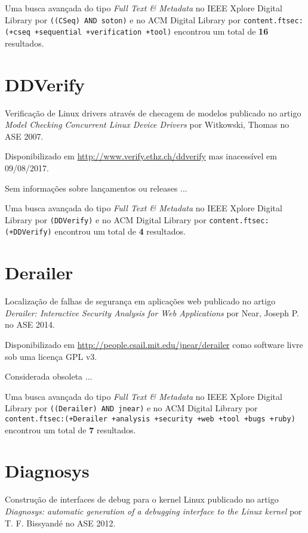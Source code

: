 Uma busca avançada do tipo {\it Full Text \& Metadata} no IEEE Xplore Digital Library por
\texttt{((CSeq) AND soton)}
e no ACM Digital Library por
\texttt{content.ftsec:(+cseq +sequential +verification +tool)}
encontrou um total de
{\bf 16}
resultados.

\section{DDVerify}

Verificação de Linux drivers através de checagem de modelos
publicado no artigo {\it Model Checking Concurrent Linux Device Drivers}
por Witkowski, Thomas
no ASE 2007.

Disponibilizado em \url{http://www.verify.ethz.ch/ddverify}
mas inacessível em 09/08/2017.

Sem informações sobre lançamentos ou releases ...


Uma busca avançada do tipo {\it Full Text \& Metadata} no IEEE Xplore Digital Library por
\texttt{(DDVerify)}
e no ACM Digital Library por
\texttt{content.ftsec:(+DDVerify)}
encontrou um total de
{\bf 4}
resultados.

\section{Derailer}

Localização de falhas de segurança em aplicações web
publicado no artigo {\it Derailer: Interactive Security Analysis for Web Applications}
por Near, Joseph P.
no ASE 2014.

Disponibilizado em \url{http://people.csail.mit.edu/jnear/derailer}
como software livre
sob uma licença GPL v3.

Considerada obsoleta ...


Uma busca avançada do tipo {\it Full Text \& Metadata} no IEEE Xplore Digital Library por
\texttt{((Derailer) AND jnear)}
e no ACM Digital Library por
\texttt{content.ftsec:(+Derailer +analysis +security +web +tool +bugs +ruby)}
encontrou um total de
{\bf 7}
resultados.

\section{Diagnosys}

Construção de interfaces de debug para o kernel Linux
publicado no artigo {\it Diagnosys: automatic generation of a debugging interface to the Linux kernel}
por T. F. Bissyandé
no ASE 2012.

